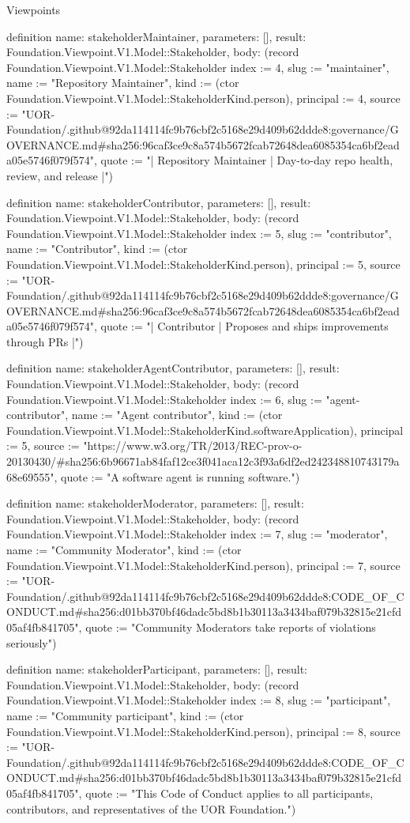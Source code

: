 \begin{lexlean}{Viewpoints}
\begin{semanticmodule}
definition{
  name: stakeholderMaintainer,
  parameters: [],
  result: Foundation.Viewpoint.V1.Model::Stakeholder,
  body: (record Foundation.Viewpoint.V1.Model::Stakeholder {index := 4, slug := "maintainer", name := "Repository Maintainer", kind := (ctor Foundation.Viewpoint.V1.Model::StakeholderKind.person), principal := 4, source := "UOR-Foundation/.github@92da114114fc9b76cbf2c5168e29d409b62ddde8:governance/GOVERNANCE.md#sha256:96caf3ce9c8a574b5672fcab72648dea6085354ca6bf2eada05e5746f079f574", quote := "| Repository Maintainer | Day-to-day repo health, review, and release |"})
}

definition{
  name: stakeholderContributor,
  parameters: [],
  result: Foundation.Viewpoint.V1.Model::Stakeholder,
  body: (record Foundation.Viewpoint.V1.Model::Stakeholder {index := 5, slug := "contributor", name := "Contributor", kind := (ctor Foundation.Viewpoint.V1.Model::StakeholderKind.person), principal := 5, source := "UOR-Foundation/.github@92da114114fc9b76cbf2c5168e29d409b62ddde8:governance/GOVERNANCE.md#sha256:96caf3ce9c8a574b5672fcab72648dea6085354ca6bf2eada05e5746f079f574", quote := "| Contributor | Proposes and ships improvements through PRs |"})
}

definition{
  name: stakeholderAgentContributor,
  parameters: [],
  result: Foundation.Viewpoint.V1.Model::Stakeholder,
  body: (record Foundation.Viewpoint.V1.Model::Stakeholder {index := 6, slug := "agent-contributor", name := "Agent contributor", kind := (ctor Foundation.Viewpoint.V1.Model::StakeholderKind.softwareApplication), principal := 5, source := "https://www.w3.org/TR/2013/REC-prov-o-20130430/#sha256:6b96671ab84faf12ce3f041aca12c3f93a6df2ed242348810743179a68e69555", quote := "A software agent is running software."})
}

definition{
  name: stakeholderModerator,
  parameters: [],
  result: Foundation.Viewpoint.V1.Model::Stakeholder,
  body: (record Foundation.Viewpoint.V1.Model::Stakeholder {index := 7, slug := "moderator", name := "Community Moderator", kind := (ctor Foundation.Viewpoint.V1.Model::StakeholderKind.person), principal := 7, source := "UOR-Foundation/.github@92da114114fc9b76cbf2c5168e29d409b62ddde8:CODE_OF_CONDUCT.md#sha256:d01bb370bf46dadc5bd8b1b30113a3434baf079b32815e21cfd05af4fb841705", quote := "Community Moderators take reports of violations seriously"})
}

definition{
  name: stakeholderParticipant,
  parameters: [],
  result: Foundation.Viewpoint.V1.Model::Stakeholder,
  body: (record Foundation.Viewpoint.V1.Model::Stakeholder {index := 8, slug := "participant", name := "Community participant", kind := (ctor Foundation.Viewpoint.V1.Model::StakeholderKind.person), principal := 8, source := "UOR-Foundation/.github@92da114114fc9b76cbf2c5168e29d409b62ddde8:CODE_OF_CONDUCT.md#sha256:d01bb370bf46dadc5bd8b1b30113a3434baf079b32815e21cfd05af4fb841705", quote := "This Code of Conduct applies to all participants, contributors, and representatives of the UOR Foundation."})
}


\end{semanticmodule}
\end{lexlean}
